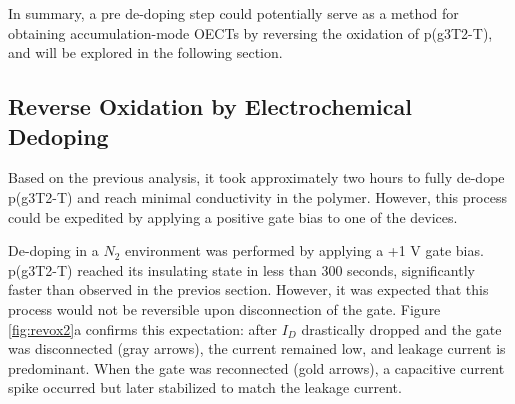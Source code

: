 In summary, a pre de-doping step could potentially serve as a method for obtaining accumulation-mode OECTs by reversing the oxidation of p(g3T2-T), and will be explored in the following section.

\subsection{Reverse Oxidation by Electrochemical Dedoping}
Based on the previous analysis, it took approximately two hours to fully de-dope p(g3T2-T) and reach minimal conductivity %
in the polymer. However, this process could be expedited by applying a positive gate bias to one of the devices.

De-doping in a $N_{2}$ environment was performed by applying a +1 V gate bias. p(g3T2-T) reached its insulating state in less than 300 seconds, significantly faster than observed in the previos section. However, it was expected that this process would not be reversible upon disconnection of the gate. Figure \ref{fig:revox2}a confirms this expectation: after $I_{D}$ drastically dropped and the gate was disconnected (gray arrows), the current remained low, and leakage current is predominant. When the gate was reconnected (gold arrows), a capacitive current spike occurred but later stabilized to match the leakage current.

